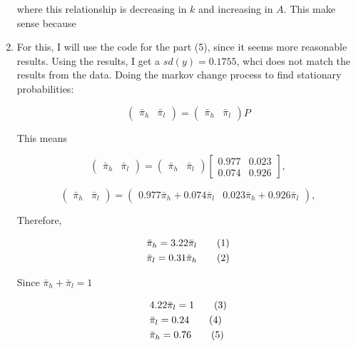 \documentclass[12pt]{article}%
\newcommand\numberthis{\addtocounter{equation}{1}\tag{\theequation}}
\begin{document}
\begin{enumerate}
	where this relationship is decreasing in $k$ and increasing in $A$. This make sense because 

	
	\item For this, I will use the code for the part (5), since it seems more reasonable results.  Using the results, I get a $sd(y)=0.1755$, whci does not match the results from the data. Doing the markov change process to find stationary probabilities:
	
		\[
	\begin{pmatrix}\bar{\pi}_{h} & \bar{\pi}_{l}\end{pmatrix}=\begin{pmatrix}\bar{\pi}_{h} & \bar{\pi}_{l}\end{pmatrix}P
	\]
	
	This means
	
	\[
	\begin{pmatrix}\bar{\pi}_{h} & \bar{\pi}_{l}\end{pmatrix}=\begin{pmatrix}\bar{\pi}_{h} & \bar{\pi}_{l}\end{pmatrix}\left[\begin{array}{cc}
	0.977 & 0.023\\
	0.074 & 0.926
	\end{array}\right],
	\]
	
			\[
	\begin{pmatrix}\bar{\pi}_{h} & \bar{\pi}_{l}\end{pmatrix}=\begin{pmatrix} 0.977\bar{\pi}_{h}+ 0.074\bar{\pi}_{l} & 	0.023\bar{\pi}_{h}+0.926\bar{\pi}_{l}\end{pmatrix},
	\]
	
		Therefore,
	
	\begin{align*}
	&\bar{\pi}_{h}=  3.22 \bar{\pi}_{l}  \numberthis \\
	&\bar{\pi}_{l}=  0.31 \bar{\pi}_{h} \numberthis \\	
	\end{align*}
	
		Since $\bar{\pi}_{h}+\bar{\pi}_{l}=1$
	
	\begin{align*}
	&4.22\bar{\pi}_{l}= 1 \numberthis \\
	&\bar{\pi}_{l}= 0.24  \numberthis \\
	&\bar{\pi}_{h}=  0.76   \numberthis \\	
	\end{align*}
	

\end{enumerate}
\end{document}
